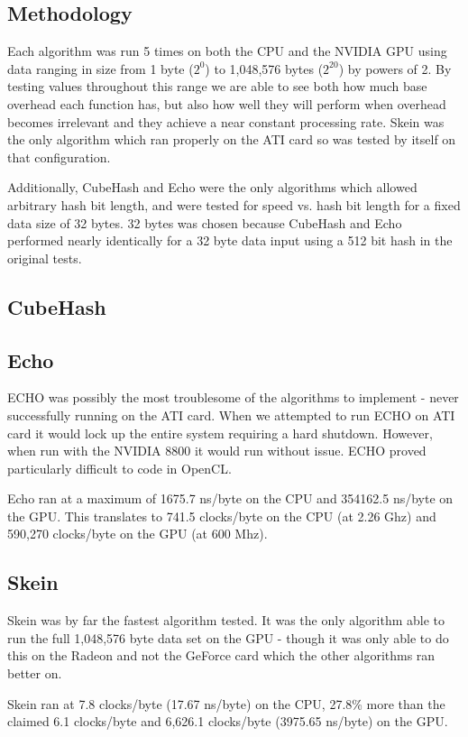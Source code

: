 \documentclass{article}
\begin{document}
\subsection*{Methodology}
Each algorithm was run 5 times on both the CPU and the NVIDIA GPU using data ranging in size from 1 byte ($2^0$) to 1,048,576 bytes ($2^{20}$) by powers of 2.
By testing values throughout this range we are able to see both how much base overhead each function has, but also how well they will perform when overhead becomes irrelevant and they achieve a near constant processing rate.
Skein was the only algorithm which ran properly on the ATI card so was tested by itself on that configuration.

Additionally, CubeHash and Echo were the only algorithms which allowed arbitrary hash bit length, and were tested for speed vs. hash bit length for a fixed data size of 32 bytes.
32 bytes was chosen because CubeHash and Echo performed nearly identically for a 32 byte data input using a 512 bit hash in the original tests.

\subsection*{CubeHash}

\subsection*{Echo}
ECHO was possibly the most troublesome of the algorithms to implement - never successfully running on the ATI card.  
When we attempted to run ECHO on ATI card it would lock up the entire system requiring a hard shutdown. 
However, when run with the NVIDIA 8800 it would run without issue.
ECHO proved particularly difficult to code in OpenCL.

Echo ran at a maximum of 1675.7 ns/byte on the CPU and 354162.5 ns/byte on the GPU.
This translates to 741.5 clocks/byte on the CPU (at 2.26 Ghz) and 590,270 clocks/byte on the GPU (at 600 Mhz).

\subsection*{Skein}
Skein was by far the fastest algorithm tested.
It was the only algorithm able to run the full 1,048,576 byte data set on the GPU - though it was only able to do this on the Radeon and not the GeForce card which the other algorithms ran better on.

Skein ran at 7.8 clocks/byte (17.67 ns/byte) on the CPU, 27.8\% more than the claimed 6.1 clocks/byte and 6,626.1 clocks/byte (3975.65 ns/byte) on the GPU.
\end{document}
